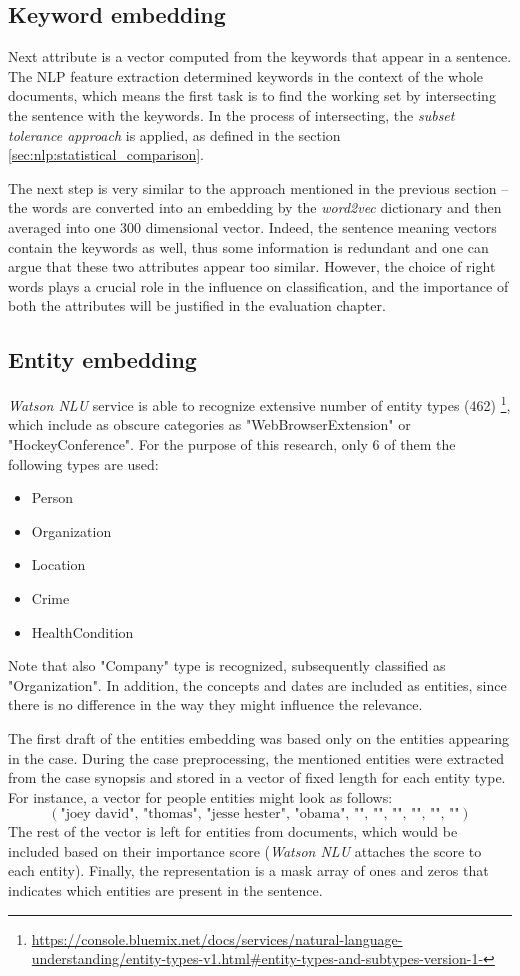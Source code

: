 \documentclass[
  digital, %
  table,   %
  lof,     %
  lot,     %
]{fithesis3}
\begin{document}
\subsection{Keyword embedding}
Next attribute is a vector computed from the keywords that appear in a sentence.
The NLP feature extraction determined keywords in the context of the whole documents, which means the first task is to find the working set by intersecting the sentence with the keywords.
In the process of intersecting, the \textit{subset tolerance approach} is applied, as defined in the section \ref{sec:nlp:statistical_comparison}.

The next step is very similar to the approach mentioned in the previous section -- the words are converted into an embedding by the \textit{word2vec} dictionary and then averaged into one 300 dimensional vector.
Indeed, the sentence meaning vectors contain the keywords as well, thus some information is redundant and one can argue that these two attributes appear too similar.
However, the choice of right words plays a crucial role in the influence on classification, and the importance of both the attributes will be justified in the evaluation chapter.

\subsection{Entity embedding}
\textit{Watson NLU} service is able to recognize extensive number of entity types (462) \footnote{\url{https://console.bluemix.net/docs/services/natural-language-understanding/entity-types-v1.html\#entity-types-and-subtypes-version-1-}}, 
which include as obscure categories as "WebBrowserExtension" or "HockeyConference".
For the purpose of this research, only 6 of them the following types are used:
\begin{itemize}
\item Person
\item Organization
\item Location
\item Crime
\item HealthCondition
\end{itemize}
Note that also "Company" type is recognized, subsequently classified as "Organization".
In addition, the concepts and dates are included as entities, since there is no difference in the way they might influence the relevance.

The first draft of the entities embedding was based only on the entities appearing in the case.
During the case preprocessing, the mentioned entities were extracted from the case synopsis and stored in a vector of fixed length for each entity type. For instance, a vector for people entities might look as follows:
$$
(\text{"joey david", "thomas", "jesse hester", "obama", "", "", "", "", "", ""})
$$
The rest of the vector is left for entities from documents, which would be included based on their importance score (\textit{Watson NLU} attaches the score to each entity).
Finally, the representation is a mask array of ones and zeros that indicates which entities are present in the sentence.
\end{document}
